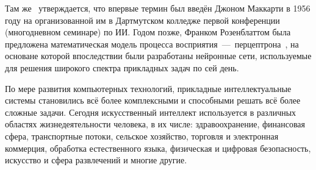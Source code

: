 Там же~\cite{bre11} утверждается, что впервые термин был введён Джоном Маккарти в 1956 году на организованной им в Дартмутском колледже первой конференции (многодневном семинаре) по ИИ. Годом позже, Франком Розенблаттом была предложена математическая модель процесса восприятия~---~перцептрона~\cite{rosenblatt}, на основане которой впоследствии были разработаны нейронные сети, используемые для решения широкого спектра прикладных задач по сей день.

По мере развития компьютерных технологий, прикладные интеллектуальные системы становились всё более комплексными и способными решать всё более сложные задачи. Сегодня искусственный интеллект используется в различных областях жизнедеятельности человека, в их числе: здравоохранение, финансовая сфера, транспортные потоки, сельское хозяйство, торговля и электронная коммерция, обработка естественного языка, физическая и цифровая безопасность, искусство и сфера развлечений и многие другие.








